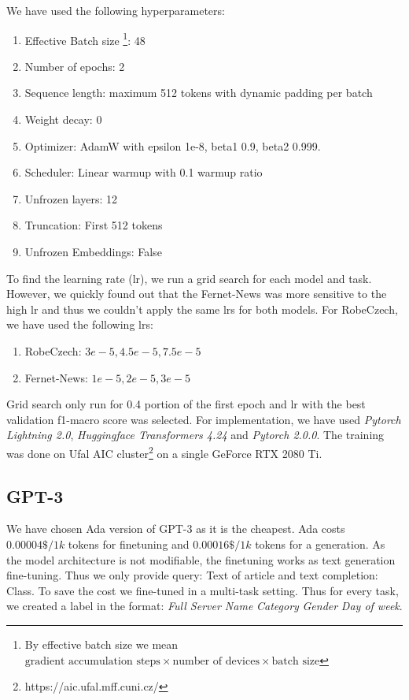 We have used the following hyperparameters:
\begin{enumerate}
    \item Effective Batch size
    \footnote{By effective batch size we mean 
    $\text{gradient accumulation steps} \times \text{number of devices}
    \times \text{batch size}$
    }: 48
    \item Number of epochs: 2
    \item Sequence length: maximum 512 tokens with dynamic padding per batch
    \item Weight decay: 0
    \item Optimizer: AdamW with epsilon 1e-8, beta1 0.9, beta2 0.999.
    \item Scheduler: Linear warmup with 0.1 warmup ratio
    \item Unfrozen layers: 12
    \item Truncation: First 512 tokens
    \item Unfrozen Embeddings: False
\end{enumerate}
To find the learning rate (lr), we run a grid search for each model and task.
However, we quickly found out that the Fernet-News was more sensitive to the high lr and thus we couldn't apply the same lrs for both models.
For RobeCzech, we have used the following lrs:
\begin{enumerate}
    \item RobeCzech: $3e-5, 4.5e-5, 7.5e-5$
    \item Fernet-News: $1e-5, 2e-5, 3e-5$
\end{enumerate}

Grid search only run for 0.4 portion of the first epoch and lr with the best validation f1-macro score was selected.
For implementation, we have used \textit{Pytorch Lightning 2.0}, \textit{Huggingface Transformers 4.24} and \textit{Pytorch 2.0.0}.
The training was done on Ufal AIC cluster\footnote{https://aic.ufal.mff.cuni.cz/} on a single GeForce RTX 2080 Ti.

\subsection{GPT-3}
\label{sec:gpt-3}
We have chosen Ada version of GPT-3 as it is the cheapest.
Ada costs $0.00004\$/1k$ tokens for finetuning and $0.00016\$/1k$ tokens for a generation.
As the model architecture is not modifiable, the finetuning works
as text generation fine-tuning.
Thus we only provide query: Text of article and text completion: Class.
To save the cost we fine-tuned in a multi-task setting.
Thus for every task, we created a label in the format: \textit{Full Server Name} \textit{Category} \textit{Gender} \textit{Day of week}.

